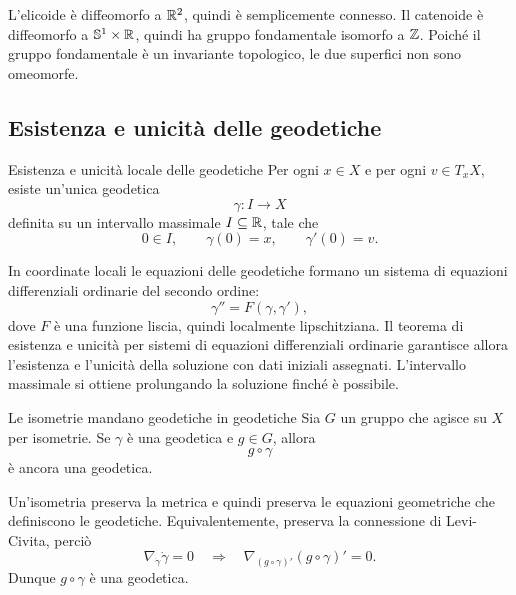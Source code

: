 \documentclass[a4paper]{article}
\begin{document}
\begin{snippetsolution}{}
L'elicoide è diffeomorfo a \(\mathbb{R}^2\), quindi è semplicemente connesso. Il catenoide è diffeomorfo a \(\mathbb{S}^1\times\mathbb{R}\), quindi ha gruppo fondamentale isomorfo a \(\mathbb{Z}\). Poiché il gruppo fondamentale è un invariante topologico, le due superfici non sono omeomorfe.
\end{snippetsolution}

\subsection{Esistenza e unicità delle geodetiche}

\begin{snippettheorem}{Esistenza e unicità locale delle geodetiche}
Per ogni \(x\in X\) e per ogni \(v\in T_xX\), esiste un'unica geodetica
\[
    \gamma:I\longrightarrow X
\]
definita su un intervallo massimale \(I\subseteq\mathbb{R}\), tale che
\[
    0\in I,
    \qquad
    \gamma(0)=x,
    \qquad
    \gamma'(0)=v.
\]
\end{snippettheorem}

\begin{snippetproof}{}
In coordinate locali le equazioni delle geodetiche formano un sistema di equazioni differenziali ordinarie del secondo ordine:
\[
    \gamma''=F(\gamma,\gamma'),
\]
dove \(F\) è una funzione liscia, quindi localmente lipschitziana. Il teorema di esistenza e unicità per sistemi di equazioni differenziali ordinarie garantisce allora l'esistenza e l'unicità della soluzione con dati iniziali assegnati. L'intervallo massimale si ottiene prolungando la soluzione finché è possibile.
\end{snippetproof}

\begin{snippetproposition}{Le isometrie mandano geodetiche in geodetiche}
Sia \(G\) un gruppo che agisce su \(X\) per isometrie. Se \(\gamma\) è una geodetica e \(g\in G\), allora
\[
    g\circ\gamma
\]
è ancora una geodetica.
\end{snippetproposition}

\begin{snippetproof}{}
Un'isometria preserva la metrica e quindi preserva le equazioni geometriche che definiscono le geodetiche. Equivalentemente, preserva la connessione di Levi-Civita, perciò
\[
    \nabla_{\dot{\gamma}}\dot{\gamma}=0
    \quad
    \Longrightarrow
    \quad
    \nabla_{(g\circ\gamma)'}(g\circ\gamma)'=0.
\]
Dunque \(g\circ\gamma\) è una geodetica.
\end{snippetproof}
\end{document}
